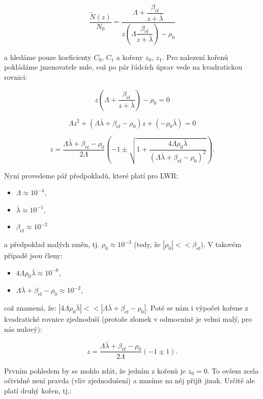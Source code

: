 $$ \dfrac{\tilde{N}(z)}{N_0} = \dfrac{\Lambda + \dfrac{\beta_{\text{ef}}}{z + \bar{\lambda}}}{z \left ( \Lambda \dfrac{\beta_{\text{ef}}}{z + \bar{\lambda}} \right ) - \rho_0} $$

a hledáme pouze koeficienty $C_0$, $C_1$ a kořeny $z_0$, $z_1$. Pro nalezení kořenů pokládáme jmenovatele nule, což po pár řádcích úprav vede na kvadratickou rovnici:

$$ z \left ( \Lambda + \dfrac{\beta_{\text{ef}}}{z + \bar{\lambda}} \right ) - \rho_0 = 0 $$

$$ \Lambda z^2 + (\Lambda \bar{\lambda} + \beta_{\text{ef}} - \rho_0) z + (- \rho_0 \bar{\lambda}) = 0 $$

$$ z = \dfrac{\Lambda \bar{\lambda} + \beta_{\text{ef}} - \rho_0}{2 \Lambda} \left ( -1 \pm \sqrt{1 + \dfrac{4 \Lambda \rho_0 \bar{\lambda}}{(\Lambda \bar{\lambda} + \beta_{\text{ef}} - \rho_0)^2}} \right ). $$

Nyní provedeme pář předpokladů, které platí pro LWR:

\begin{itemize}
  \item $\Lambda \approx 10^{-4}$,
  \item $\bar{\lambda} \approx 10^{-1}$,
  \item $\beta_{\text{ef}} \approx 10^{-2}$
\end{itemize}

a předpoklad malých změn, tj. $\rho_0 \approx 10^{-3}$ (tedy, že $|\rho_0| << \beta_{\text{ef}}$). V takovém případě jsou členy:

\begin{itemize}
  \item $4 \Lambda \rho_0 \bar{\lambda} \approx 10^{-8}$,
  \item $\Lambda \bar{\lambda} + \beta_{\text{ef}} - \rho_0 \approx 10^{-2}$,
\end{itemize}

což znamená, že: $|4 \Lambda \rho_0 \bar{\lambda}| << |\Lambda \bar{\lambda} + \beta_{\text{ef}} - \rho_0|$. Poté se nám i výpočet kořene z kvadratické rovnice zjednoduší (protože zlomek v odmocnině je velmi malý, pro nás nulový):

$$ z = \dfrac{\Lambda \bar{\lambda} + \beta_{\text{ef}} - \rho_0}{2 \Lambda} \left ( -1 \pm 1 \right ). $$

Prvním pohledem by se mohlo zdát, že jedním z kořenů je $z_0 = 0$. To ovšem zcela očividně není pravda (vliv zjednodušení) a musíme na něj přijít jinak. Určitě ale platí druhý kořen, tj.:

